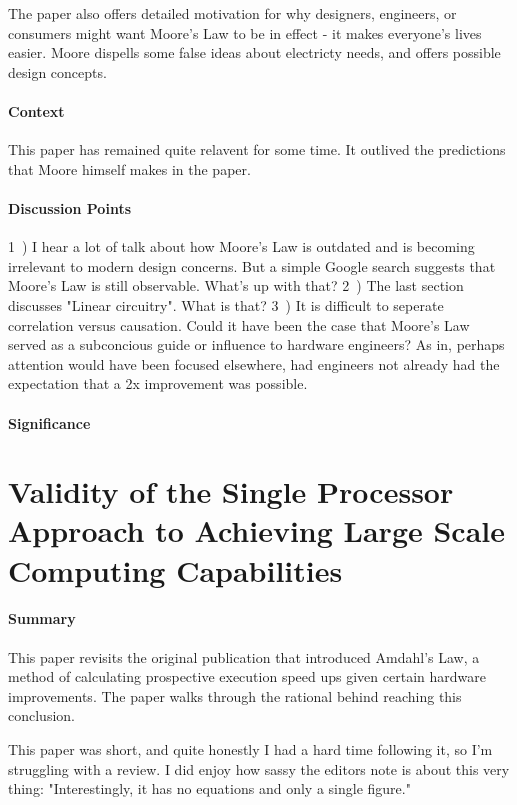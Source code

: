 The paper also offers detailed motivation for why designers, engineers, or
consumers might want Moore's Law to be in effect - it makes everyone's lives
easier. Moore dispells some false ideas about electricty needs, and offers
possible design concepts.
\paragraph{\textbf{Context}}
This paper has remained quite relavent for some time. It outlived the
predictions that Moore himself makes in the paper.
\paragraph{\textbf{Discussion Points}}
1~) I hear a lot of talk about how Moore's Law is outdated and is becoming
irrelevant to modern design concerns. But a simple Google search suggests
that Moore's Law is still observable. What's up with that?
2~) The last section discusses "Linear circuitry". What is that?
3~) It is difficult to seperate correlation versus causation. Could it have
been the case that Moore's Law served as a subconcious guide or influence to
hardware engineers? As in, perhaps attention would have been focused
elsewhere, had engineers not already had the expectation that a 2x
improvement was possible.
\paragraph{\textbf{Significance}}


\section {Validity of the Single Processor Approach to Achieving Large Scale
Computing Capabilities \cite{amdahl1967validity}}


\paragraph{\textbf{Summary}}
This paper revisits the original publication that introduced Amdahl's Law,
a method of calculating prospective execution speed ups given certain
hardware improvements. The paper walks through the rational behind reaching
this conclusion.

This paper was short, and quite honestly I had a hard time following it, so
I'm struggling with a review. I did enjoy how sassy the editors note is
about this very thing: "Interestingly, it has no equations and only a single
figure."

